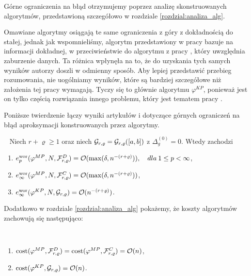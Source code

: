 \documentclass[oik, pdftex, man]{mgrwms}
\begin{document}
    Górne ograniczenia na błąd otrzymujemy poprzez analizę skonstruowanych algorytmów, przedstawioną szczegółowo w rozdziale \ref{rozdzial:analiza_alg}.
    
    Omawiane algorytmy osiągają te same ograniczenia z góry z dokładnością do stałej, jednak jak wspomnieliśmy, algorytm przedstawiony w pracy \cite{CoDF} bazuje na informacji dokładnej, w przeciwieństwie do algorytmu z pracy \cite{AoP}, który uwzględnia zaburzenie danych. Ta różnica wpłynęła na to, że do uzyskania tych samych wyników autorzy doszli w odmienny sposób. Aby lepiej przedstawić przebieg rozumowania, nie uogólniamy wyników, które są bardziej szczegółowe niż założenia tej pracy wymagają. Tyczy się to głównie algorytmu $\varphi^{KP}$, ponieważ jest on tylko częścią rozwiązania innego problemu, który jest tematem pracy \cite{CoDF}.

    Poniższe twierdzenie łączy wyniki artykułów \cite{CoDF} i \cite{AoP} dotyczące górnych ograniczeń na błąd aproksymacji konstruowanych przez algorytmy.
    
    \begin{thm} \label{thm:1:ograniczenia_z_gory}~%
        Niech $r+\varrho \geq 1$ oraz niech $\mathcal{G}_{r,\varrho} = \mathcal{G}_{r,\varrho}([a,b])$ z $\Delta_{g}^{(0)} = 0$. Wtedy zachodzi
        \begin{enumerate}[label=(\roman*)]
            \item \label{thm:1:i}$e_{p}^{\mathrm{wor}}(\varphi^{MP},N,\mathcal{F}_{r,\varrho}^{D}) = \mathcal{O}(\max(\delta, n^{-(r+\varrho)})), \quad dla \: 1 \leq p < \infty$,
            \item \label{thm:1:ii}$e_{\infty}^{\mathrm{wor}}(\varphi^{MP},N,\mathcal{F}_{r,\varrho}^{C}) = \mathcal{O}(\max(\delta, n^{-(r+\varrho)}))$,
            \item \label{thm:1:iii}$e_{\infty}^{\mathrm{wor}}(\varphi^{KP},N,\mathcal{G}_{r,\varrho}) = \mathcal{O}(n^{-(r+\varrho)})$.
        \end{enumerate}
    \end{thm}
    
    \newpage

    Dodatkowo w rozdziale \ref{rozdzial:analiza_alg} pokażemy, że koszty algorytmów zachowują się następująco:

    \begin{stw}~%
        \begin{enumerate}
            \item $\mathrm{cost}(\varphi^{MP}, \mathcal{F}_{r,\varrho}^{D}) = \mathrm{cost}(\varphi^{MP}, \mathcal{F}_{r,\varrho}^{C}) = \mathcal{O}(n)$,
            \item $\mathrm{cost}(\varphi^{KP}, \mathcal{G}_{r,\varrho}) = \mathcal{O}(n)$.
        \end{enumerate}
    \end{stw}
\end{document}
